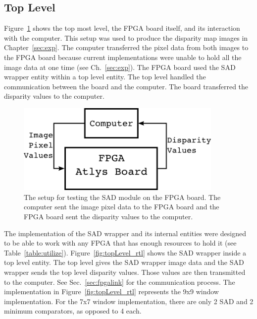 \subsection{Top Level}

Figure~\ref{fig:compFPGAcomp} shows the top most level, the FPGA board itself, and its interaction with the computer. This setup was used to produce the disparity map images in Chapter~\ref{sec:exp}. The computer transferred the pixel data from both images to the FPGA board because current implementations were unable to hold all the image data at one time (see Ch.~\ref{sec:exp}). The FPGA board used the SAD wrapper entity within a top level entity. The top level handled the communication between the board and the computer. The board transferred the disparity values to the computer.

\begin{figure}
	\begin{center}
		\includegraphics[width=100mm]{figures/compFPGAcomp.png}
		\captionfonts
		\caption{The setup for testing the SAD module on the FPGA board. The computer sent the image pixel data to the FPGA board and the FPGA board sent the disparity values to the computer.}
		\label{fig:compFPGAcomp}
	\end{center}
\end{figure}

The implementation of the SAD wrapper and its internal entities were designed to be able to work with any FPGA that has enough resources to hold it (see Table~\ref{table:utilize}). Figure~\ref{fig:topLevel_rtl} shows the SAD wrapper inside a top level entity. The top level gives the SAD wrapper image data and the SAD wrapper sends the top level disparity values. Those values are then transmitted to the computer. See Sec.~\ref{sec:fpgalink} for the communication process. The implementation in Figure~\ref{fig:topLevel_rtl} represents the 9x9 window implementation. For the 7x7 window implementation, there are only 2 SAD and 2 minimum comparators, as opposed to 4 each.


